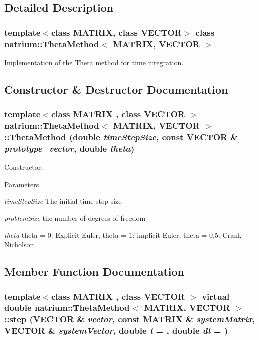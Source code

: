 \subsection{Detailed Description}
\subsubsection*{template$<$class MATRIX, class VECTOR$>$ class natrium::ThetaMethod$<$ MATRIX, VECTOR $>$}

Implementation of the Theta method for time integration. 

\subsection{Constructor \& Destructor Documentation}
\hypertarget{classnatrium_1_1ThetaMethod_a7b5ec1aa8b646768c45cc422651ec905}{
\subsubsection[{ThetaMethod}]{\setlength{\rightskip}{0pt plus 5cm}template$<$class MATRIX , class VECTOR $>$ {\bf natrium::ThetaMethod}$<$ MATRIX, VECTOR $>$::{\bf ThetaMethod} (double {\em timeStepSize}, \/  const VECTOR \& {\em prototype\_\-vector}, \/  double {\em theta})}}
\label{classnatrium_1_1ThetaMethod_a7b5ec1aa8b646768c45cc422651ec905}


Constructor. 
\begin{DoxyParams}{Parameters}
\item[{\em timeStepSize}]The initial time step size \item[{\em problemSize}]the number of degrees of freedom \item[{\em theta}]theta = 0: Explicit Euler, theta = 1: implicit Euler, theta = 0.5: Crank-\/Nicholson. \end{DoxyParams}


\subsection{Member Function Documentation}
\hypertarget{classnatrium_1_1ThetaMethod_a25fb9b235e61a96de76139919d7fbbfe}{
\subsubsection[{step}]{\setlength{\rightskip}{0pt plus 5cm}template$<$class MATRIX , class VECTOR $>$ virtual double {\bf natrium::ThetaMethod}$<$ MATRIX, VECTOR $>$::step (VECTOR \& {\em vector}, \/  const MATRIX \& {\em systemMatrix}, \/  VECTOR \& {\em systemVector}, \/  double {\em t} = {}, \/  double {\em dt} = {})}}
\label{classnatrium_1_1ThetaMethod_a25fb9b235e61a96de76139919d7fbbfe}


